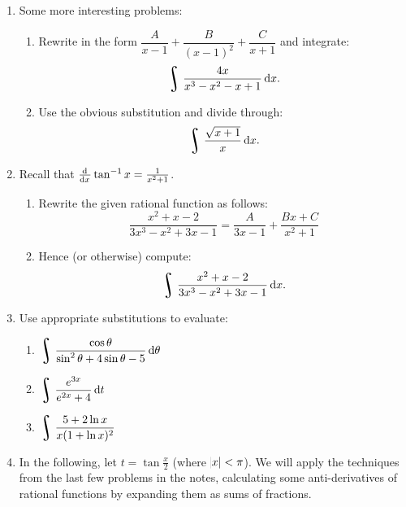 \begin{enumerate}[resume]
  \item Some more interesting problems:
    \begin{enumerate}
      \item Rewrite in the form $ \dfrac{A}{x-1} + \dfrac{B}{(x-1)^2} + \dfrac{C}{x + 1} $ and integrate:
        \begin{displaymath}
          \rint \dfrac{4x}{x^3 - x^2 - x + 1} \dif{x}.
        \end{displaymath}
      \item Use the obvious substitution and divide through:
        \begin{displaymath}
          \rint \dfrac{\sqrt{x+1}}{x} \dif{x}.
        \end{displaymath}
    \end{enumerate}
  \item Recall that $ \od{}{x} \tan^{-1} x = \frac{1}{x^2 + 1} $.
    \begin{enumerate}
      \item Rewrite the given rational function as follows:
            \begin{displaymath}
              \frac{x^2 + x - 2}{3x^3 - x^2 + 3x - 1} = \frac{A}{3x - 1} + \frac{Bx + C}{x^2 + 1}
            \end{displaymath}
      \item Hence (or otherwise) compute:
            \begin{displaymath}
              \rint \frac{x^2 + x - 2}{3x^3 - x^2 + 3x - 1} \dif{x}.
            \end{displaymath}
    \end{enumerate}
  \item Use appropriate substitutions to evaluate:
    \begin{enumerate}
      \item $ \displaystyle\rint \dfrac{\cos \theta}{\sin^2 \theta + 4 \sin \theta - 5} \dif{\theta} $
      \item $ \displaystyle\rint \dfrac{e^{3x}}{e^{2x} + 4} \dif{t} $
      \item $ \displaystyle\rint \dfrac{5 + 2\ln x}{x(1 + \ln x)^2} $
    \end{enumerate}
  \item In the following, let $ t = \tan \frac{x}{2} $ (where $ \abs{x} < \pi $). We will apply the techniques
        from the last few problems in the notes, calculating some anti-derivatives of rational functions by
        expanding them as sums of fractions.

\end{enumerate}
